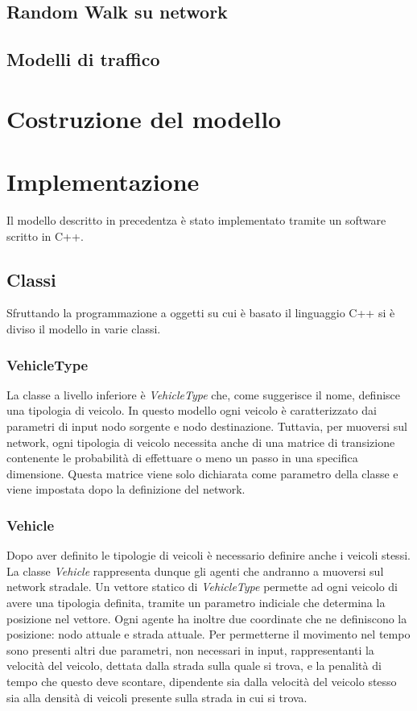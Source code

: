 \documentclass[12pt,a4paper]{report}
\begin{document}
\section*{Random Walk su network}

\section*{Modelli di traffico}

\chapter{Costruzione del modello}

\chapter{Implementazione}
Il modello descritto in precedentza è stato implementato tramite un software scritto in C++.
\section{Classi}
Sfruttando la programmazione a oggetti su cui è basato il linguaggio C++ si è diviso il modello in varie classi.
\subsection{VehicleType}
La classe a livello inferiore è \emph{VehicleType} che, come suggerisce il nome, definisce una tipologia di veicolo.
In questo modello ogni veicolo è caratterizzato dai parametri di input nodo sorgente e nodo destinazione.
Tuttavia, per muoversi sul network, ogni tipologia di veicolo necessita anche di una matrice di transizione contenente le probabilità di effettuare o meno un passo in una specifica dimensione.
Questa matrice viene solo dichiarata come parametro della classe e viene impostata dopo la definizione del network.
\subsection{Vehicle}
Dopo aver definito le tipologie di veicoli è necessario definire anche i veicoli stessi.
La classe \emph{Vehicle} rappresenta dunque gli agenti che andranno a muoversi sul network stradale.
Un vettore statico di \emph{VehicleType} permette ad ogni veicolo di avere una tipologia definita, tramite un parametro indiciale che determina la posizione nel vettore.
Ogni agente ha inoltre due coordinate che ne definiscono la posizione: nodo attuale e strada attuale.
Per permetterne il movimento nel tempo sono presenti altri due parametri, non necessari in input, rappresentanti la velocità del veicolo, dettata dalla strada sulla quale si trova, e la penalità di tempo che questo deve scontare, dipendente sia dalla velocità del veicolo stesso sia alla densità di veicoli presente sulla strada in cui si trova.
\end{document}
